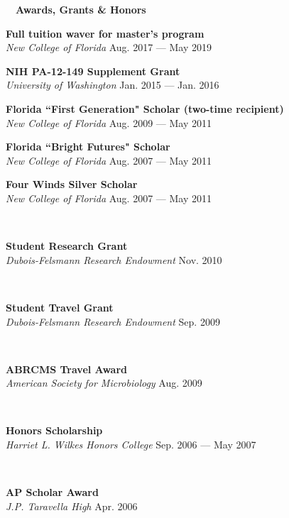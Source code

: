 \documentclass[a4paper,12pt]{article}
\newcommand{\resheading}[1]{{\hspace{-9pt} \colorbox{mygrey}{\begin{minipage}{\textwidth}{\textmd{~~\large \textbf{#1} \vphantom{p\^{E}}}}\end{minipage}}\vspace{6pt}} }
\newcommand{\ressubheading}[4]{{\begin{minipage}{\textwidth}
        \textbf{#1} \hfill #2 \\
        \textit{#3} \hfill #4 \\
        \end{minipage}}}
\begin{document}

        
        
\resheading{Awards, Grants \& Honors}
     \ressubheading{Full tuition waver for master's program}{}{New College of Florida}{Aug. 2017 ---  May 2019}
         
    \ressubheading{NIH PA-12-149 Supplement Grant}{}{University of Washington}{Jan. 2015 --- Jan. 2016}


    \ressubheading{Florida ``First Generation" Scholar {\normalfont(two-time recipient)}}{}{New College of Florida}{Aug. 2009 --- May 2011}

    \ressubheading{Florida ``Bright Futures" Scholar}{}{New College of Florida}{Aug. 2007 --- May 2011}

    \ressubheading{Four Winds Silver Scholar}{}{New College of Florida}{Aug. 2007 --- May 2011}\
    
    
    \ressubheading{Student Research Grant}{}{Dubois-Felsmann Research Endowment}{Nov. 2010}\
    
    \ressubheading{Student Travel Grant}{}{Dubois-Felsmann Research Endowment}{Sep. 2009}\
    
    \ressubheading{ABRCMS Travel Award}{}{American Society for Microbiology}{Aug. 2009}\
    
    \ressubheading{Honors Scholarship}{}{Harriet L. Wilkes Honors College}{Sep. 2006 --- May 2007}\
    
    \ressubheading{AP Scholar Award}{}{J.P. Taravella High}{Apr. 2006}
\end{document}
